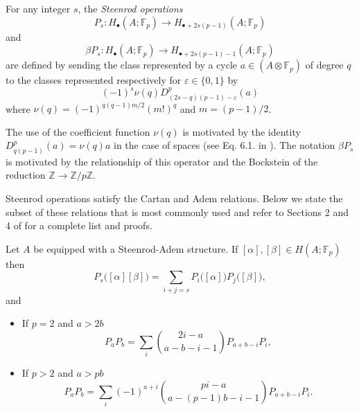 \begin{definition} \label{def: Steenrod operations at odd prime}
	For any integer $s$, the \textit{Steenrod operations}
	\begin{equation*}
	P_s : H_\bullet(A; \mathbb{F}_p) \to H_{\bullet + 2s(p-1)}(A; \mathbb{F}_p)
	\end{equation*}
	and
	\begin{equation*}
	\beta P_s : H_\bullet(A; \mathbb{F}_p) \to H_{\bullet + 2s(p-1) - 1}(A; \mathbb{F}_p)
	\end{equation*}
	are defined by sending the class represented by a cycle $a \in (A \otimes \mathbb{F}_p)$ of degree $q$ to the classes represented respectively for $\varepsilon \in\{0,1\}$ by
	\begin{equation*}
	(-1)^s \nu(q) D^p_{(2s-q)(p-1)-\varepsilon}(a)
	\end{equation*}
	where $\nu(q) = (-1)^{q(q-1)m/2}(m!)^q$ and $m = (p-1)/2$.
\end{definition}

\begin{remark}
	The use of the coefficient function $\nu(q)$ is motivated by the identity $D_{q(p-1)}^p(a) = \nu(q)a$ in the case of spaces (see Eq. 6.1. in \cite{steenrod53cyclic}). The notation $\beta P_s$ is motivated by the relationship of this operator and the Bockstein of the reduction $\mathbb Z \to \mathbb Z/p\mathbb Z$.
\end{remark}

Steenrod operations satisfy the Cartan and Adem relations. Below we state the subset of these relations that is most commonly used and refer to Sections 2 and 4 of \cite{may70generalapproach} for a complete list and proofs.
\begin{lemma}
	Let $A$ be equipped with a Steenrod-Adem structure. If $[\alpha], [\beta] \in H(A;\mathbb{F}_p)$ then
	\begin{equation*}
	P_s\big([\alpha] [\beta]\big) = \sum_{i+j=s} P_i\big( [\alpha] \big) P_j\big( [\beta] \big),
	\end{equation*}
	and
	\begin{itemize}
		\item If $p = 2$ and $a > 2b$
		\begin{equation*}
		P_{a}P_{b} = \sum_i {2i-a \choose a-b-i-1} P_{a+b-i}P_i,
		\end{equation*}
		\item If $p > 2$ and $a > pb$
		\begin{equation*}
		P_{a}P_{b} = \sum_i (-1)^{a+i}{pi-a \choose a-(p-1)b-i-1} P_{a+b-i}P_i.
		\end{equation*}
	\end{itemize}		
\end{lemma}

